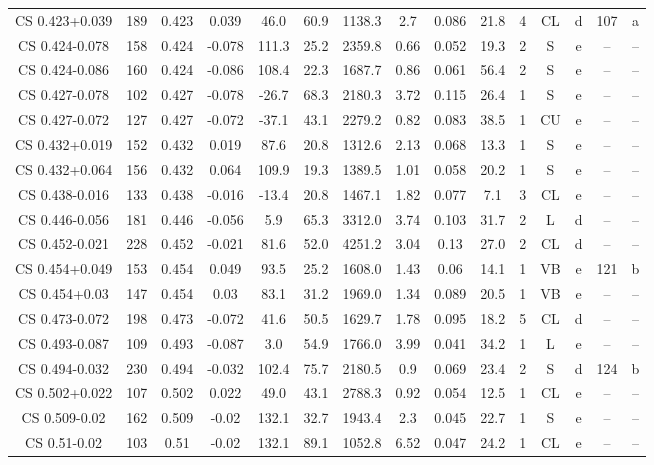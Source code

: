 \begin{table}
\begin{tabular}{ccccccccccccccc}
CS 0.423+0.039 & 189 & 0.423 & 0.039 & 46.0 & 60.9 & 1138.3 & 2.7 & 0.086 & 21.8 & 4 & CL & d & 107 & a \\
CS 0.424-0.078 & 158 & 0.424 & -0.078 & 111.3 & 25.2 & 2359.8 & 0.66 & 0.052 & 19.3 & 2 & S & e & -- & -- \\
CS 0.424-0.086 & 160 & 0.424 & -0.086 & 108.4 & 22.3 & 1687.7 & 0.86 & 0.061 & 56.4 & 2 & S & e & -- & -- \\
CS 0.427-0.078 & 102 & 0.427 & -0.078 & -26.7 & 68.3 & 2180.3 & 3.72 & 0.115 & 26.4 & 1 & S & e & -- & -- \\
CS 0.427-0.072 & 127 & 0.427 & -0.072 & -37.1 & 43.1 & 2279.2 & 0.82 & 0.083 & 38.5 & 1 & CU & e & -- & -- \\
CS 0.432+0.019 & 152 & 0.432 & 0.019 & 87.6 & 20.8 & 1312.6 & 2.13 & 0.068 & 13.3 & 1 & S & e & -- & -- \\
CS 0.432+0.064 & 156 & 0.432 & 0.064 & 109.9 & 19.3 & 1389.5 & 1.01 & 0.058 & 20.2 & 1 & S & e & -- & -- \\
CS 0.438-0.016 & 133 & 0.438 & -0.016 & -13.4 & 20.8 & 1467.1 & 1.82 & 0.077 & 7.1 & 3 & CL & e & -- & -- \\
CS 0.446-0.056 & 181 & 0.446 & -0.056 & 5.9 & 65.3 & 3312.0 & 3.74 & 0.103 & 31.7 & 2 & L & d & -- & -- \\
CS 0.452-0.021 & 228 & 0.452 & -0.021 & 81.6 & 52.0 & 4251.2 & 3.04 & 0.13 & 27.0 & 2 & CL & d & -- & -- \\
CS 0.454+0.049 & 153 & 0.454 & 0.049 & 93.5 & 25.2 & 1608.0 & 1.43 & 0.06 & 14.1 & 1 & VB & e & 121 & b \\
CS 0.454+0.03 & 147 & 0.454 & 0.03 & 83.1 & 31.2 & 1969.0 & 1.34 & 0.089 & 20.5 & 1 & VB & e & -- & -- \\
CS 0.473-0.072 & 198 & 0.473 & -0.072 & 41.6 & 50.5 & 1629.7 & 1.78 & 0.095 & 18.2 & 5 & CL & d & -- & -- \\
CS 0.493-0.087 & 109 & 0.493 & -0.087 & 3.0 & 54.9 & 1766.0 & 3.99 & 0.041 & 34.2 & 1 & L & e & -- & -- \\
CS 0.494-0.032 & 230 & 0.494 & -0.032 & 102.4 & 75.7 & 2180.5 & 0.9 & 0.069 & 23.4 & 2 & S & d & 124 & b \\
CS 0.502+0.022 & 107 & 0.502 & 0.022 & 49.0 & 43.1 & 2788.3 & 0.92 & 0.054 & 12.5 & 1 & CL & e & -- & -- \\
CS 0.509-0.02 & 162 & 0.509 & -0.02 & 132.1 & 32.7 & 1943.4 & 2.3 & 0.045 & 22.7 & 1 & S & e & -- & -- \\
CS 0.51-0.02 & 103 & 0.51 & -0.02 & 132.1 & 89.1 & 1052.8 & 6.52 & 0.047 & 24.2 & 1 & CL & e & -- & -- \\

\end{tabular}
\end{table}
